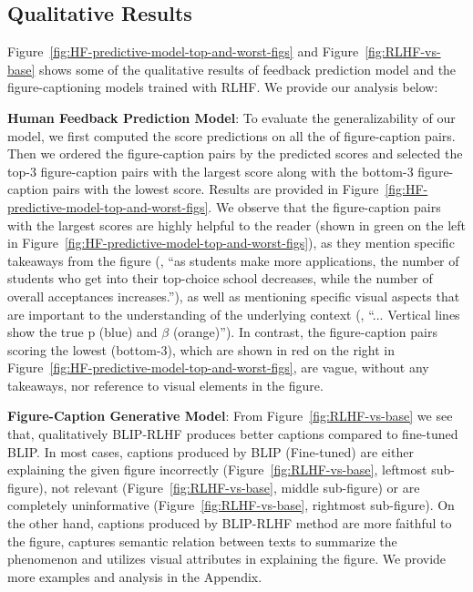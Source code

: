 \documentclass[11pt]{article}
\newcommand{\rev}[1]{\textcolor{blue}{#1}}
\begin{document}
\subsection{Qualitative Results}
Figure~\ref{fig:HF-predictive-model-top-and-worst-figs} and Figure~\ref{fig:RLHF-vs-base} shows some of the qualitative results of feedback prediction model and the figure-captioning models trained with RLHF. We provide our analysis below:

\textbf{Human Feedback Prediction Model}:
To evaluate the generalizability of our model, we first computed the score predictions on all the of figure-caption pairs. Then we ordered the figure-caption pairs by the predicted scores and selected the top-3 figure-caption pairs with the largest score along with the bottom-3 figure-caption pairs with the lowest score. Results are provided in Figure~\ref{fig:HF-predictive-model-top-and-worst-figs}.
We observe that the figure-caption pairs with the largest scores are highly helpful to the reader (shown in green on the left in Figure~\ref{fig:HF-predictive-model-top-and-worst-figs}), as they mention specific takeaways from the figure (\eg, ``as students make more applications, the number of students who get into their top-choice school decreases, while the number of overall acceptances increases.''), as well as mentioning specific visual aspects that are important to the understanding of the underlying context (\eg, ``... Vertical lines show the true p (blue) and $\beta$ (orange)'').
In contrast, the figure-caption pairs scoring the lowest (bottom-3), which are shown in red on the right in Figure~\ref{fig:HF-predictive-model-top-and-worst-figs}, are vague, without any takeaways, nor reference to visual elements in the figure.


\eat{%
\rev{%
As an aside, the above results used the helpfulness score from our human experts for training the human feedback prediction model.
However, similar results were observed using the other factors collected from human experts about the figure captions. 
}%
}%

\textbf{Figure-Caption Generative Model}:
From Figure~\ref{fig:RLHF-vs-base} we see that, qualitatively BLIP-RLHF produces better captions compared to fine-tuned BLIP. In most cases, captions produced by BLIP (Fine-tuned) are either explaining the given figure incorrectly (Figure~\ref{fig:RLHF-vs-base}, leftmost sub-figure), not relevant (Figure~\ref{fig:RLHF-vs-base}, middle sub-figure) or are completely uninformative (Figure~\ref{fig:RLHF-vs-base}, rightmost sub-figure). On the other hand, captions produced by BLIP-RLHF method are more faithful to the figure, captures semantic relation between texts to summarize the phenomenon and utilizes visual attributes in explaining the figure. We provide more examples and analysis in the Appendix.
\end{document}
